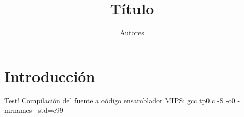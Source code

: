 \documentclass{article}
\title{Título}
\author{Autores}
\begin{document}
\maketitle
\section{Introducción}
Test!
Compilación del fuente a código ensamblador MIPS:
gcc tp0.c -S -o0 -mrnames --std=c99
\end{document}
